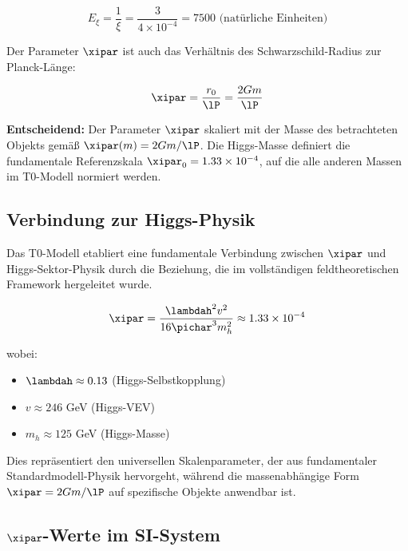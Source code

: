 	\begin{equation}
		E_\xi = \frac{1}{\xi} = \frac{3}{4 \times 10^{-4}} = 7500 \text{ (natürliche Einheiten)}
	\end{equation}
	
	Der Parameter $\xipar$ ist auch das Verhältnis des Schwarzschild-Radius zur Planck-Länge:
	
	\begin{equation}
		\xipar = \frac{r_0}{\lP} = \frac{2Gm}{\lP}
		\label{eq:xi_definition}
	\end{equation}
	
\textbf{Entscheidend:} Der Parameter $\xipar$ skaliert mit der Masse des betrachteten Objekts gemäß $\xipar(m) = 2Gm/\lP$. Die Higgs-Masse definiert die fundamentale Referenzskala $\xipar_0 = 1.33 \times 10^{-4}$, auf die alle anderen Massen im T0-Modell normiert werden.
	
	\subsection{Verbindung zur Higgs-Physik}
	\label{subsec:xi_higgs_verbindung}
	
	Das T0-Modell etabliert eine fundamentale Verbindung zwischen $\xipar$ und Higgs-Sektor-Physik durch die Beziehung, die im vollständigen feldtheoretischen Framework hergeleitet wurde.
	
	\begin{equation}
		\xipar = \frac{\lambdah^2 v^2}{16\pichar^3 m_h^2} \approx 1.33 \times 10^{-4}
		\label{eq:xi_higgs_fundamental}
	\end{equation}
	
	wobei:
	\begin{itemize}
		\item $\lambdah \approx 0.13$ (Higgs-Selbstkopplung)
		\item $v \approx 246$ GeV (Higgs-VEV)
		\item $m_h \approx 125$ GeV (Higgs-Masse)
	\end{itemize}
	
	Dies repräsentiert den universellen Skalenparameter, der aus fundamentaler Standardmodell-Physik hervorgeht, während die massenabhängige Form $\xipar = 2Gm/\lP$ auf spezifische Objekte anwendbar ist.
	
	\subsection{$\xipar$-Werte im SI-System}
	\label{subsec:xi_si_werte}
	
